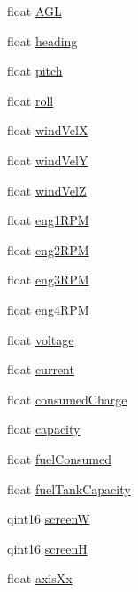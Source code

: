 \begin{DoxyCompactItemize}
\item 
float \hyperlink{group___aero_sim_r_c_gadaa747e1f33381fce539ba3df9915281}{\-A\-G\-L}
\item 
float \hyperlink{group___aero_sim_r_c_ga62f831b287508b68a2b0ad45a9d2dc18}{heading}
\item 
float \hyperlink{group___aero_sim_r_c_ga2ae727a3d4523188e3b7e5c664c22637}{pitch}
\item 
float \hyperlink{group___aero_sim_r_c_ga5ae77c3d47014ab64ef930314843a0fe}{roll}
\item 
float \hyperlink{group___aero_sim_r_c_ga28ae11206edb7d479d61f42edfe59a6a}{wind\-Vel\-X}
\item 
float \hyperlink{group___aero_sim_r_c_ga4a4ed34bd3c1e67d51b1d5b2272cbf3f}{wind\-Vel\-Y}
\item 
float \hyperlink{group___aero_sim_r_c_ga28ceecb62e11bce71b44c63ea4af67aa}{wind\-Vel\-Z}
\item 
float \hyperlink{group___aero_sim_r_c_ga92a2016c6887c978c9179cf3bf117c5a}{eng1\-R\-P\-M}
\item 
float \hyperlink{group___aero_sim_r_c_ga2fa372d547f9f33642415f454bccf402}{eng2\-R\-P\-M}
\item 
float \hyperlink{group___aero_sim_r_c_ga12d0b07a1f43644fa7b16c0b53409ef9}{eng3\-R\-P\-M}
\item 
float \hyperlink{group___aero_sim_r_c_gac7d5d72d3237905c99ee5b63859e7df3}{eng4\-R\-P\-M}
\item 
float \hyperlink{group___aero_sim_r_c_ga598e987b250d694aeaced9fb921e03bd}{voltage}
\item 
float \hyperlink{group___aero_sim_r_c_ga67b8bd84d98afe25c5300ecaa1e3b1ac}{current}
\item 
float \hyperlink{group___aero_sim_r_c_ga408ab8a806126f8c39a224202f7784c9}{consumed\-Charge}
\item 
float \hyperlink{group___aero_sim_r_c_ga735a5ea26beaee930a4bd7e2d8e18398}{capacity}
\item 
float \hyperlink{group___aero_sim_r_c_gae96b24ccedba1107673cdc5889815f58}{fuel\-Consumed}
\item 
float \hyperlink{group___aero_sim_r_c_ga9d9432e29718f1a2d3e3bb4445bb3705}{fuel\-Tank\-Capacity}
\item 
qint16 \hyperlink{group___aero_sim_r_c_ga0e82f7a599641d119734afe4a0f4403c}{screen\-W}
\item 
qint16 \hyperlink{group___aero_sim_r_c_gaf9235fc17924379e9bdd0826d1111e2c}{screen\-H}
\item 
float \hyperlink{group___aero_sim_r_c_ga693a3fedba573cb60ae2ced78f2f55e8}{axis\-Xx}

\end{DoxyCompactItemize}
